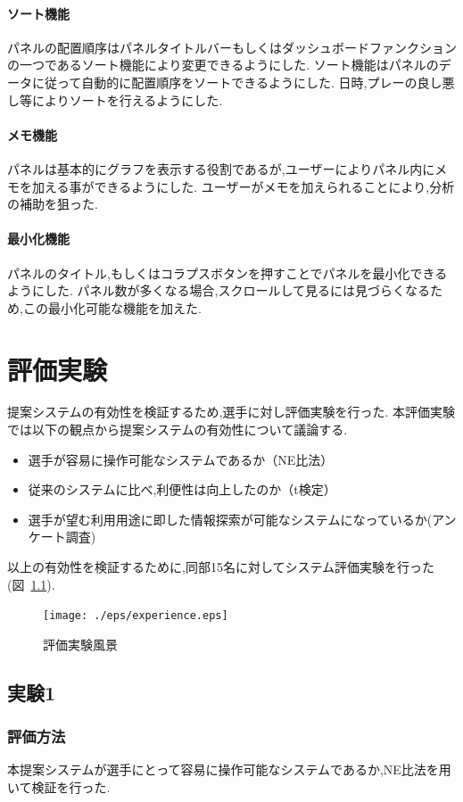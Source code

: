 \documentclass[sotsuron]{kuee}
\begin{document}
			\subsubsection{ソート機能}
			パネルの配置順序はパネルタイトルバーもしくはダッシュボードファンクションの一つであるソート機能により変更できるようにした.
			ソート機能はパネルのデータに従って自動的に配置順序をソートできるようにした.
			日時,プレーの良し悪し等によりソートを行えるようにした.
			\subsubsection{メモ機能}
			パネルは基本的にグラフを表示する役割であるが,ユーザーによりパネル内にメモを加える事ができるようにした.
			ユーザーがメモを加えられることにより,分析の補助を狙った.
			\subsubsection{最小化機能}
			パネルのタイトル,もしくはコラプスボタンを押すことでパネルを最小化できるようにした.
			パネル数が多くなる場合,スクロールして見るには見づらくなるため,この最小化可能な機能を加えた.

\chapter{評価実験}
	提案システムの有効性を検証するため,選手に対し評価実験を行った.
	本評価実験では以下の観点から提案システムの有効性について議論する.
	\begin{itemize}
		\item 選手が容易に操作可能なシステムであるか（NE比法）
		\item 従来のシステムに比べ,利便性は向上したのか（t検定）
		\item 選手が望む利用用途に即した情報探索が可能なシステムになっているか(アンケート調査)
	\end{itemize}
	以上の有効性を検証するために,同部15名に対してシステム評価実験を行った(図~\ref{fig:experi}).
		\begin{figure}
			\begin{center}
				\texttt{[image: ./eps/experience.eps]}
			\end{center}
			\caption{評価実験風景}
	  		\label{fig:experi}
		\end{figure}
	\section{実験1}
		\subsection{評価方法}
			本提案システムが選手にとって容易に操作可能なシステムであるか,NE比法を用いて検証を行った.
\end{document}
